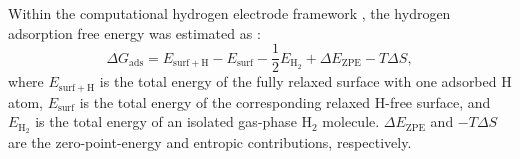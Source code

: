 \documentclass[journal=jacsat,manuscript=article]{achemso}
\begin{document}
Within the computational hydrogen electrode framework \cite{NORSKOV2004}, the hydrogen adsorption free energy was estimated as \cite{Liao2022,Sholl2009DensityTheory,Martin2004ElectronicMethods}:
\begin{equation}
  \Delta G_{\mathrm{ads}}
  =
  E_{\mathrm{surf+H}}
  -
  E_{\mathrm{surf}}
  -
  \frac{1}{2}E_{\mathrm{H_2}}
  +
  \Delta E_{\mathrm{ZPE}}
  -
  T\Delta S,
  \label{eq:Gads}
\end{equation}
where $E_{\mathrm{surf+H}}$ is the total energy of the fully relaxed surface with one adsorbed H atom, $E_{\mathrm{surf}}$ is the total energy of the corresponding relaxed H-free surface, and $E_{\mathrm{H_2}}$ is the total energy of an isolated gas-phase H$_2$ molecule. $\Delta E_{\mathrm{ZPE}}$ and $-T\Delta S$ are the zero-point-energy and entropic contributions, respectively.
\end{document}
